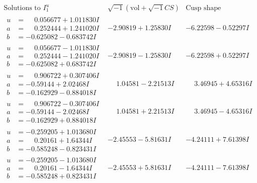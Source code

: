 \documentclass[1p]{elsarticle_modified}
\theoremstyle{definition}
\newcommand{\I}{\sqrt{-1}}
\begin{document}
$$\begin{array}{c|c|c}  
\text{Solutions to }I^u_{1}& \I (\text{vol} + \sqrt{-1}CS) & \text{Cusp shape}\\
 \hline 
\begin{aligned}
u &= \phantom{-}0.056677 + 1.011830 I \\
a &= \phantom{-}0.252444 + 1.241020 I \\
b &= -0.625082 - 0.683742 I\end{aligned}
 & -2.90819 + 1.25830 I & -6.22598 - 0.52297 I \\ \hline\begin{aligned}
u &= \phantom{-}0.056677 - 1.011830 I \\
a &= \phantom{-}0.252444 - 1.241020 I \\
b &= -0.625082 + 0.683742 I\end{aligned}
 & -2.90819 - 1.25830 I & -6.22598 + 0.52297 I \\ \hline\begin{aligned}
u &= \phantom{-}0.906722 + 0.307406 I \\
a &= -0.59144 + 2.02468 I \\
b &= -0.162929 - 0.884018 I\end{aligned}
 & \phantom{-}1.04581 - 2.21513 I & \phantom{-}3.46945 + 4.65316 I \\ \hline\begin{aligned}
u &= \phantom{-}0.906722 - 0.307406 I \\
a &= -0.59144 - 2.02468 I \\
b &= -0.162929 + 0.884018 I\end{aligned}
 & \phantom{-}1.04581 + 2.21513 I & \phantom{-}3.46945 - 4.65316 I \\ \hline\begin{aligned}
u &= -0.259205 + 1.013680 I \\
a &= \phantom{-}0.20161 + 1.64344 I \\
b &= -0.585248 - 0.823431 I\end{aligned}
 & -2.45553 - 5.81631 I & -4.24111 + 7.61398 I \\ \hline\begin{aligned}
u &= -0.259205 - 1.013680 I \\
a &= \phantom{-}0.20161 - 1.64344 I \\
b &= -0.585248 + 0.823431 I\end{aligned}
 & -2.45553 + 5.81631 I & -4.24111 - 7.61398 I \\ \hline\begin{aligned}

\end{aligned}
\end{array}$$
\end{document}
